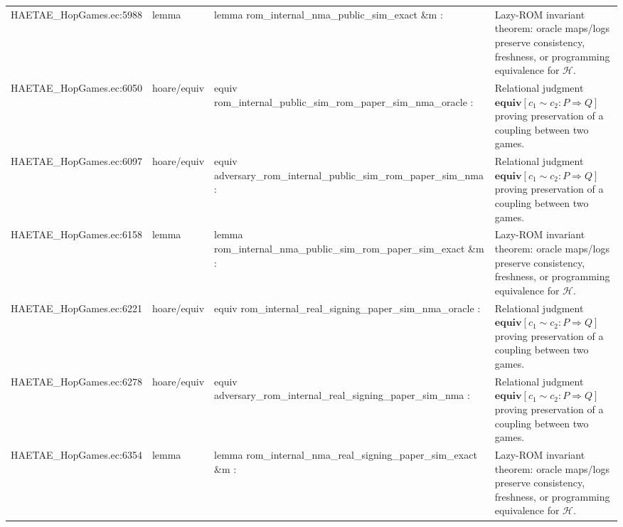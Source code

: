 \documentclass[10pt]{article}
\begin{document}
\begin{longtable}{L{0.11\textwidth}L{0.055\textwidth}L{0.385\textwidth}L{0.41\textwidth}}
HAETAE\_\allowbreak{}HopGames.\allowbreak{}ec:\allowbreak{}5988 & lemma & {\ttfamily\scriptsize lemma rom\_\allowbreak{}internal\_\allowbreak{}nma\_\allowbreak{}public\_\allowbreak{}sim\_\allowbreak{}exact \&m :} & Lazy-ROM invariant theorem: oracle maps/logs preserve consistency, freshness, or programming equivalence for $\mathcal H$. \\
HAETAE\_\allowbreak{}HopGames.\allowbreak{}ec:\allowbreak{}6050 & hoare/equiv & {\ttfamily\scriptsize equiv rom\_\allowbreak{}internal\_\allowbreak{}public\_\allowbreak{}sim\_\allowbreak{}rom\_\allowbreak{}paper\_\allowbreak{}sim\_\allowbreak{}nma\_\allowbreak{}oracle :} & Relational judgment $\mathbf{equiv}[c_1\sim c_2:P\Rightarrow Q]$ proving preservation of a coupling between two games. \\
HAETAE\_\allowbreak{}HopGames.\allowbreak{}ec:\allowbreak{}6097 & hoare/equiv & {\ttfamily\scriptsize equiv adversary\_\allowbreak{}rom\_\allowbreak{}internal\_\allowbreak{}public\_\allowbreak{}sim\_\allowbreak{}rom\_\allowbreak{}paper\_\allowbreak{}sim\_\allowbreak{}nma :} & Relational judgment $\mathbf{equiv}[c_1\sim c_2:P\Rightarrow Q]$ proving preservation of a coupling between two games. \\
HAETAE\_\allowbreak{}HopGames.\allowbreak{}ec:\allowbreak{}6158 & lemma & {\ttfamily\scriptsize lemma rom\_\allowbreak{}internal\_\allowbreak{}nma\_\allowbreak{}public\_\allowbreak{}sim\_\allowbreak{}rom\_\allowbreak{}paper\_\allowbreak{}sim\_\allowbreak{}exact \&m :} & Lazy-ROM invariant theorem: oracle maps/logs preserve consistency, freshness, or programming equivalence for $\mathcal H$. \\
HAETAE\_\allowbreak{}HopGames.\allowbreak{}ec:\allowbreak{}6221 & hoare/equiv & {\ttfamily\scriptsize equiv rom\_\allowbreak{}internal\_\allowbreak{}real\_\allowbreak{}signing\_\allowbreak{}paper\_\allowbreak{}sim\_\allowbreak{}nma\_\allowbreak{}oracle :} & Relational judgment $\mathbf{equiv}[c_1\sim c_2:P\Rightarrow Q]$ proving preservation of a coupling between two games. \\
HAETAE\_\allowbreak{}HopGames.\allowbreak{}ec:\allowbreak{}6278 & hoare/equiv & {\ttfamily\scriptsize equiv adversary\_\allowbreak{}rom\_\allowbreak{}internal\_\allowbreak{}real\_\allowbreak{}signing\_\allowbreak{}paper\_\allowbreak{}sim\_\allowbreak{}nma :} & Relational judgment $\mathbf{equiv}[c_1\sim c_2:P\Rightarrow Q]$ proving preservation of a coupling between two games. \\
HAETAE\_\allowbreak{}HopGames.\allowbreak{}ec:\allowbreak{}6354 & lemma & {\ttfamily\scriptsize lemma rom\_\allowbreak{}internal\_\allowbreak{}nma\_\allowbreak{}real\_\allowbreak{}signing\_\allowbreak{}paper\_\allowbreak{}sim\_\allowbreak{}exact \&m :} & Lazy-ROM invariant theorem: oracle maps/logs preserve consistency, freshness, or programming equivalence for $\mathcal H$. \\

\end{longtable}
\end{document}
